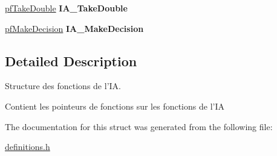 \begin{DoxyCompactItemize}
\item 
\hypertarget{structSIA__Functions_a6092898193c97ae42b8b39be8998e230}{
\hyperlink{backgammon_8h_afe7dc2d94cf907e098b2da6d59118000}{pfTakeDouble} {\bfseries IA\_\-TakeDouble}}
\label{structSIA__Functions_a6092898193c97ae42b8b39be8998e230}

\item 
\hypertarget{structSIA__Functions_ab01764a11abb5ba9a403e987debea632}{
\hyperlink{backgammon_8h_a6d46036e7a9a9e5216f61e64e9c411ab}{pfMakeDecision} {\bfseries IA\_\-MakeDecision}}
\label{structSIA__Functions_ab01764a11abb5ba9a403e987debea632}

\end{DoxyCompactItemize}


\subsection{Detailed Description}
Structure des fonctions de l'IA. 

Contient les pointeurs de fonctions sur les fonctions de l'IA 

The documentation for this struct was generated from the following file:\begin{DoxyCompactItemize}
\item 
\hyperlink{definitions_8h}{definitions.h}\end{DoxyCompactItemize}
